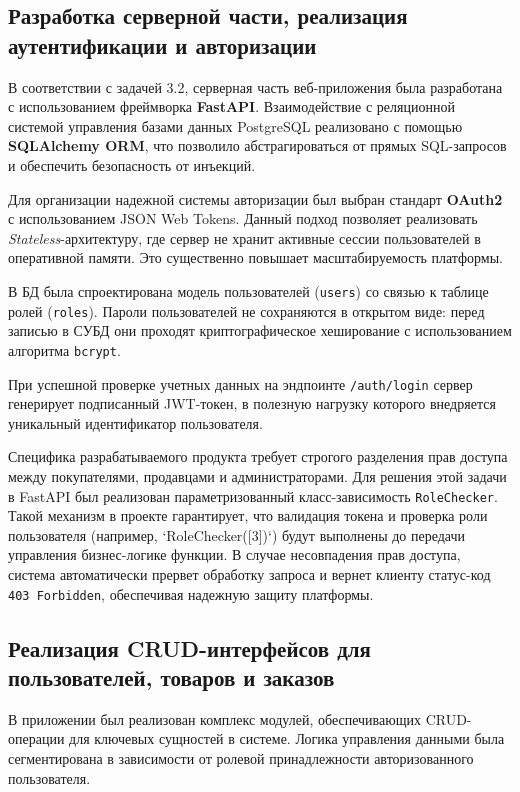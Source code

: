 \subsection{Разработка серверной части, реализация аутентификации и авторизации}

В соответствии с задачей 3.2, серверная часть веб-приложения была разработана с использованием фреймворка \textbf{FastAPI}. Взаимодействие с реляционной системой 
управления базами данных PostgreSQL реализовано с помощью \textbf{SQLAlchemy ORM}, что позволило абстрагироваться от прямых SQL-запросов и обеспечить безопасность от инъекций.

Для организации надежной системы авторизации был выбран стандарт \textbf{OAuth2} с использованием JSON Web Tokens. Данный подход позволяет 
реализовать \textit{Stateless}-архитектуру, где сервер не хранит активные сессии пользователей в оперативной памяти. Это существенно повышает масштабируемость платформы. 

В БД была спроектирована модель пользователей (\texttt{users}) со связью к таблице ролей (\texttt{roles}). Пароли пользователей не сохраняются в 
открытом виде: перед записью в СУБД они проходят криптографическое хеширование с использованием алгоритма \texttt{bcrypt}. 

При успешной проверке учетных данных на эндпоинте \texttt{/auth/login} сервер генерирует подписанный JWT-токен, в полезную нагрузку которого внедряется
уникальный идентификатор пользователя.

Специфика разрабатываемого продукта требует строгого разделения прав доступа между покупателями, продавцами и администраторами. Для решения этой 
задачи в FastAPI был реализован параметризованный класс-зависимость \texttt{RoleChecker}. Такой механизм в проекте гарантирует, 
что валидация токена и проверка роли пользователя (например, `RoleChecker([3])`) будут выполнены до передачи управления бизнес-логике функции. В случае несовпадения 
прав доступа, система автоматически прервет обработку запроса и вернет клиенту статус-код \texttt{403 Forbidden}, обеспечивая надежную 
защиту платформы.

\subsection{Реализация CRUD-интерфейсов для пользователей, товаров и заказов}

В приложении был реализован комплекс модулей, обеспечивающих CRUD-операции для ключевых сущностей в системе. Логика управления данными была 
сегментирована в зависимости от ролевой принадлежности авторизованного пользователя.

